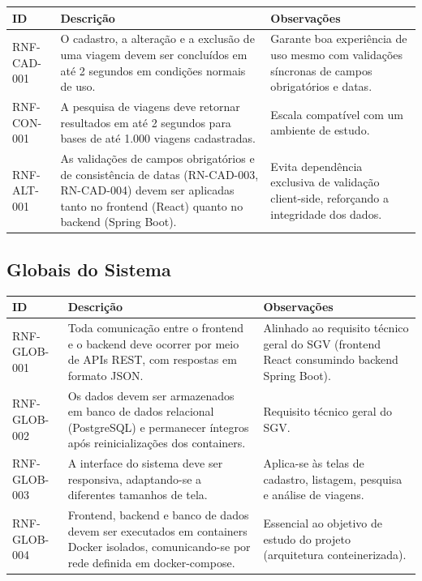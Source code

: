 \documentclass[12pt,article,oneside,a4paper]{abntex2}
\begin{document}
\begin{xltabular}{\textwidth}{|l|Y|Y|}
\hline
{}
\textbf{ID} & \textbf{Descrição} & \textbf{Observações} \\
\hline
\endhead
RNF-CAD-001 & O cadastro, a alteração e a exclusão de uma viagem devem ser concluídos em até 2 segundos em condições normais de uso. & Garante boa experiência de uso mesmo com validações síncronas de campos obrigatórios e datas. \\
\hline
RNF-CON-001 & A pesquisa de viagens deve retornar resultados em até 2 segundos para bases de até 1.000 viagens cadastradas. & Escala compatível com um ambiente de estudo. \\
\hline
RNF-ALT-001 & As validações de campos obrigatórios e de consistência de datas (RN-CAD-003, RN-CAD-004) devem ser aplicadas tanto no frontend (React) quanto no backend (Spring Boot). & Evita dependência exclusiva de validação client-side, reforçando a integridade dos dados. \\
\hline
\end{xltabular}

\bigskip

\subsection{Globais do Sistema}

\begin{xltabular}{\textwidth}{|l|Y|Y|}
\hline
{}
\textbf{ID} & \textbf{Descrição} & \textbf{Observações} \\
\hline
\endhead
RNF-GLOB-001 & Toda comunicação entre o frontend e o backend deve ocorrer por meio de APIs REST, com respostas em formato JSON. & Alinhado ao requisito técnico geral do SGV (frontend React consumindo backend Spring Boot). \\
\hline
RNF-GLOB-002 & Os dados devem ser armazenados em banco de dados relacional (PostgreSQL) e permanecer íntegros após reinicializações dos containers. & Requisito técnico geral do SGV. \\
\hline
RNF-GLOB-003 & A interface do sistema deve ser responsiva, adaptando-se a diferentes tamanhos de tela. & Aplica-se às telas de cadastro, listagem, pesquisa e análise de viagens. \\
\hline
RNF-GLOB-004 & Frontend, backend e banco de dados devem ser executados em containers Docker isolados, comunicando-se por rede definida em docker-compose. & Essencial ao objetivo de estudo do projeto (arquitetura conteinerizada). \\
\hline
\end{xltabular}
\end{document}
